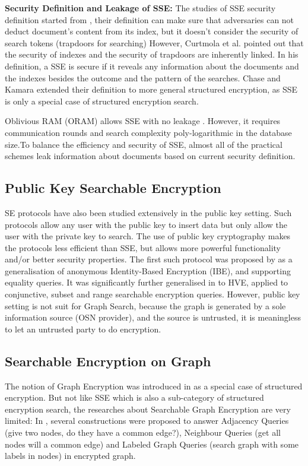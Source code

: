 {\bf Security Definition and Leakage of SSE:} The studies of SSE security definition started from \cite{goh2003secure}, their definition can make sure that adversaries can not deduct document's content from its index, but it doesn't consider the security of search tokens (trapdoors for searching) However, Curtmola et al. \cite{curtmola2011searchable} pointed out that the security of indexes and the security of trapdoors are inherently linked. In his definition, a SSE is secure if it reveals any information about the documents and the indexes besides the outcome and the pattern of the searches. Chase and Kamara \cite{chase2010structured} extended their definition to more general structured encryption, as SSE is only a special case of structured encryption search.

Oblivious RAM (ORAM) allows SSE with no leakage \cite{goldreich1996software}. However, it requires communication rounds and search complexity poly-logarithmic in the database size.To balance the efficiency and security of SSE, almost all of the practical schemes leak information about documents based on current security definition.

\subsection{Public Key Searchable Encryption}
SE protocols have also been studied extensively in the public key setting. Such protocols allow any user with the public key to insert data but only allow the user with the private key to search. The use of public key cryptography makes the protocols less efficient than SSE, but allows more powerful functionality and/or better security properties. The first such protocol was proposed by \cite{boneh2004public} as a generalisation of anonymous Identity-Based Encryption (IBE), and supporting equality queries. It was significantly further generalised in \cite{boneh2007conjunctive} to HVE, applied to conjunctive, subset and range searchable encryption queries. However, public key setting is not suit for Graph Search, because the graph is generated by a sole information source (OSN provider), and the source is untrusted, it is meaningless to let an untrusted party to do encryption.

\subsection{Searchable Encryption on Graph}
The notion of Graph Encryption was introduced in \cite{chase2010structured} as a special case of structured encryption. But not like SSE which is also a sub-category of structured encryption search, the researches about Searchable Graph Encryption are very limited: In \cite{chase2010structured}, several constructions were proposed to answer Adjacency Queries (give two nodes, do they have a common edge?), Neighbour Queries (get all nodes will a common edge) and Labeled Graph Queries (search graph with some labels in nodes) in encrypted graph.

